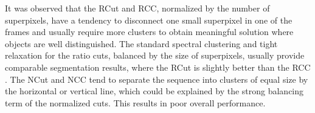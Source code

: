 It was observed that the RCut and RCC, normalized by the number of superpixels, have a tendency to disconnect one small superpixel in one of the frames and usually require more clusters
to obtain meaningful solution where objects are well distinguished. 
The standard spectral clustering and tight relaxation for the ratio cuts, balanced by the size of superpixels, usually provide comparable segmentation results, where the RCut is slightly better than the RCC . 
The NCut and NCC tend to separate the sequence into clusters of equal size by the horizontal or vertical line, which could be explained by the strong balancing term of the normalized cuts. This results in poor 
overall performance.
